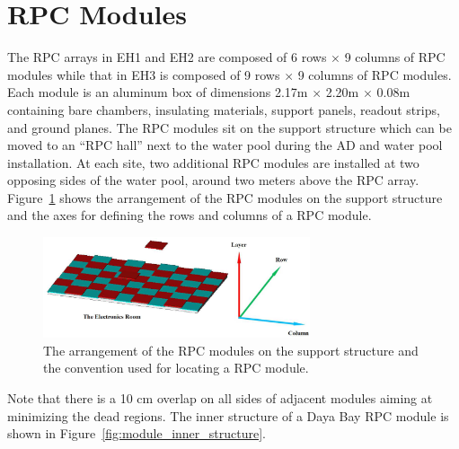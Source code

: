 

\section{RPC Modules}
The RPC arrays in EH1 and EH2 are composed of 6 rows $\times$ 9 columns of RPC modules while that in EH3 is composed of 9 rows $\times$ 9 columns of RPC modules. Each module is an aluminum box of dimensions 2.17m $\times$ 2.20m $\times$ 0.08m containing bare chambers, insulating materials, support panels, readout strips, and ground planes. The RPC modules sit on the support structure which can be moved to an ``RPC hall'' next to the water pool during the AD and water pool installation. At each site, two additional RPC modules are installed at two opposing sides of the water pool, around two meters above the RPC array. Figure~\ref{fig:support_structure} shows the arrangement of the RPC modules on the support structure and the axes for defining the rows and columns of a RPC module.
\begin{figure}
	\centering
	\includegraphics[width=0.7\textwidth]{figures/chap5/support_structure.eps}
	\caption{The arrangement of the RPC modules on the support structure and the convention used for locating a RPC module.}
	\label{fig:support_structure}
\end{figure}
Note that there is a 10 cm overlap on all sides of adjacent modules aiming at minimizing the dead regions. The inner structure of a Daya Bay RPC module is shown in Figure~\ref{fig:module_inner_structure}.
